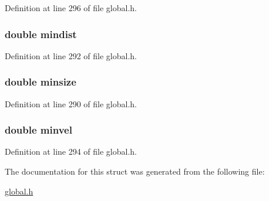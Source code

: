 Definition at line 296 of file global.\-h.

\hypertarget{structstatisticsData_a78455d23ec97258967b76cbb2332b7be}{
\subsubsection[{mindist}]{\setlength{\rightskip}{0pt plus 5cm}double mindist}}\label{structstatisticsData_a78455d23ec97258967b76cbb2332b7be}


Definition at line 292 of file global.\-h.

\hypertarget{structstatisticsData_ad99dc4104d1898b6e593bbf331e41c69}{
\subsubsection[{minsize}]{\setlength{\rightskip}{0pt plus 5cm}double minsize}}\label{structstatisticsData_ad99dc4104d1898b6e593bbf331e41c69}


Definition at line 290 of file global.\-h.

\hypertarget{structstatisticsData_a1b9d00ac67b4ceca8e7747a50edc802b}{
\subsubsection[{minvel}]{\setlength{\rightskip}{0pt plus 5cm}double minvel}}\label{structstatisticsData_a1b9d00ac67b4ceca8e7747a50edc802b}


Definition at line 294 of file global.\-h.



The documentation for this struct was generated from the following file\-:\begin{DoxyCompactItemize}
\item 
\hyperlink{global_8h}{global.\-h}\end{DoxyCompactItemize}
